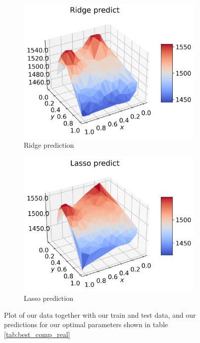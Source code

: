 \documentclass[12pt]{article}
\begin{document}
\begin{figure}[H]
\begin{subfigure}{.5\textwidth}
    \label{fig:real_pred_ols_skip}
  \end{subfigure}
  \begin{subfigure}{.5\textwidth}
    \centering
    \includegraphics[width=\textwidth]{../figures/ridge_pred_n40_skip2.png}
    \caption{Ridge prediction}
    \label{fig:real_pred_ridge_skip}
  \end{subfigure}
  \begin{subfigure}{.5\textwidth}
    \centering
    \includegraphics[width=\textwidth]{../figures/lasso_pred_n40_skip2.png}
    \caption{Lasso prediction}
    \label{fig:real_pred_lasos_skip}
  \end{subfigure}
  \caption{Plot of our data together with our train and test data, and our predictions for our optimal parameters shown in table \ref{tab:best_comp_real} }
  \label{fig:pred_real_skip}
\end{figure}
\end{document}
